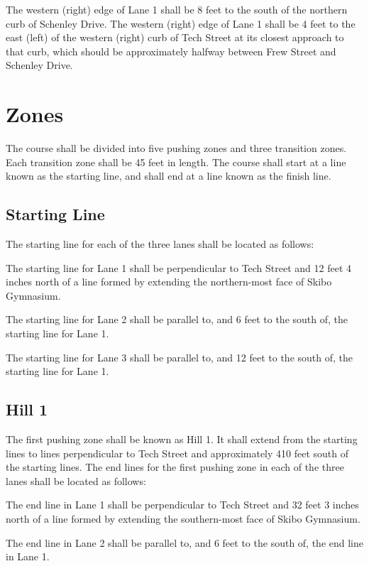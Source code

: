 The western (right) edge of Lane 1 shall be 8 feet to the south of the northern curb of Schenley Drive. The western (right) edge of Lane 1 shall be 4 feet to the east (left) of the western (right) curb of Tech Street at its closest approach to that curb, which should be approximately halfway between Frew Street and Schenley Drive.

\section{Zones}

The course shall be divided into five pushing zones and three transition zones. Each transition zone shall be 45 feet in length. The course shall start at a line known as the starting line, and shall end at a line known as the finish line.

\subsection{Starting Line}

The starting line for each of the three lanes shall be located as follows:

The starting line for Lane 1 shall be perpendicular to Tech Street and 12 feet 4 inches north of a line formed by extending the northern-most face of Skibo Gymnasium.

The starting line for Lane 2 shall be parallel to, and 6 feet to the south of, the starting line for Lane 1.

The starting line for Lane 3 shall be parallel to, and 12 feet to the south of, the starting line for Lane 1.

\subsection{Hill 1}

The first pushing zone shall be known as Hill 1. It shall extend from the starting lines to lines perpendicular to Tech Street and approximately 410 feet south of the starting lines. The end lines for the first pushing zone in each of the three lanes shall be located as follows:

The end line in Lane 1 shall be perpendicular to Tech Street and 32 feet 3 inches north of a line formed by extending the southern-most face of Skibo Gymnasium.

The end line in Lane 2 shall be parallel to, and 6 feet to the south of, the end line in Lane 1.

